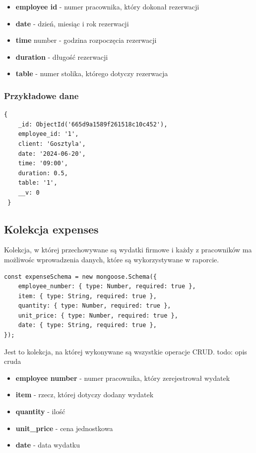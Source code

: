 \documentclass[12pt]{article}
\begin{document}
\begin{itemize}
	\item \textbf{employee id} - numer pracownika, który dokonał rezerwacji
	\item \textbf{date} - dzień, miesiąc i rok rezerwacji
	\item \textbf{time} number - godzina rozpoczęcia rezerwacji
	\item \textbf{duration} - długość rezerwacji
	\item \textbf{table} - numer stolika, którego dotyczy rezerwacja
\end{itemize}

\subsubsection{Przykładowe dane}
\begin{lstlisting}[]
 {
	_id: ObjectId('665d9a1589f261518c10c452'),
    employee_id: '1',
    client: 'Gosztyla',
    date: '2024-06-20',
    time: '09:00',
    duration: 0.5,
    table: '1',
    __v: 0
 }
\end{lstlisting}

\newpage
\begin{samepage}
\subsection{Kolekcja expenses}
Kolekcja, w której przechowywane są wydatki firmowe i każdy z pracowników ma możliwośc wprowadzenia danych, które są wykorzystywane w raporcie.
\begin{lstlisting}[caption={Expenses}]
const expenseSchema = new mongoose.Schema({
	employee_number: { type: Number, required: true },
	item: { type: String, required: true },
	quantity: { type: Number, required: true },
	unit_price: { type: Number, required: true },
	date: { type: String, required: true },
});
\end{lstlisting}
Jest to kolekcja, na której wykonywane są wszystkie operacje CRUD.
todo: opis cruda
\end{samepage}

\begin{itemize}
	\item \textbf{employee number} - numer pracownika, który zerejestrował wydatek
	\item \textbf{item} - rzecz, której dotyczy dodany wydatek
	\item \textbf{quantity} - ilość 
	\item \textbf{unit\_price} - cena jednostkowa
	\item \textbf{date} - data wydatku
\end{itemize}
\end{document}
